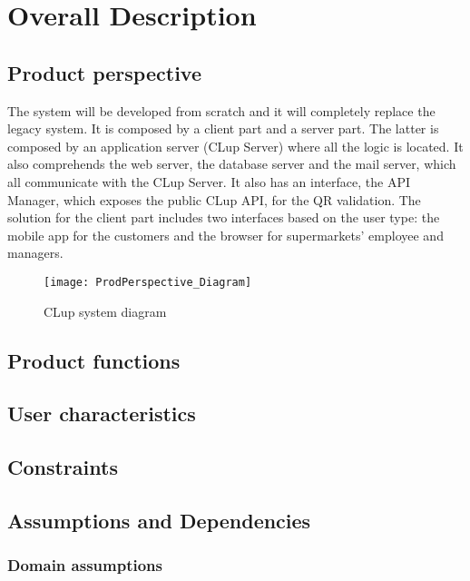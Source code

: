 \chapter{Overall Description}

\section{Product perspective}

The system will be developed from scratch and it will completely replace the legacy system. \newline
It is composed by a client part and a server part.
The latter is composed by an application server (CLup Server) where all the logic is located. It also comprehends the web server, the database server and the mail server,
which all communicate with the CLup Server.
It also has an interface, the API Manager, which exposes the public CLup API, for the QR validation.\newline
The solution for the client part includes two interfaces based on the user type: the mobile app for the customers and the browser for supermarkets' employee and managers.
\begin{figure}[H]
	\centering
	\texttt{[image: ProdPerspective\_Diagram]}
	\caption{CLup system diagram}	
\end{figure}	 

\section{Product functions}

\section{User characteristics}

\section{Constraints}

\section{Assumptions and Dependencies}

\subsection{Domain assumptions}
